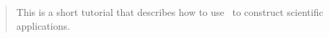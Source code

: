 %


\begin{abstract}
  This is a short tutorial that describes how to use \pyre\ to construct scientific
  applications.
\end{abstract}


